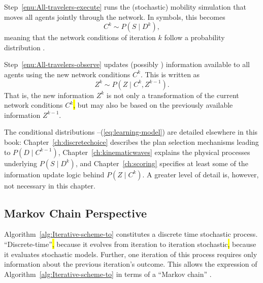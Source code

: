 
Step~\ref{enu:All-travelers-execute} runs  the (stochastic) mobility
simulation that moves all agents jointly through the network. In symbols,
this becomes
\begin{equation}
C^{k}\sim P(S\mid D^{k}),\label{eq:network-loading-model}
\end{equation}\corr{,}{}
meaning that the network conditions of iteration $k$ follow a
probability distribution .

Step~\ref{enu:All-travelers-observe} updates  (possibly
) information available to all agents
using the new network conditions $C^{k}$. This is written as
\begin{equation}
Z^{k}\sim P(Z\mid C^{k},Z^{k-1}).\label{eq:learning-model}
\end{equation}
That is, the new information $Z^{k}$ is not only a transformation
of the current network conditions $C^{k}$\hl{,} but may also be based on
the previously available information $Z^{k-1}$.

The conditional distributions --(\ref{eq:learning-model})
are detailed elsewhere in this book: Chapter~\ref{ch:discretechoice} 
describes the plan selection mechanisms leading to $P(D\mid C^{k-1})$,
Chapter~\ref{ch:kinematicwaves} explains the physical processes underlying
$P(S\mid D^{k})$, and Chapter~\ref{ch:scoring}
specifies at least some of the information update logic behind $P(Z\mid C^{k})$. 
A greater level of detail is, however, not necessary in this chapter.


\subsection{\label{sub:Markov-chain-perspective}Markov Chain Perspective}

Algorithm~\ref{alg:Iterative-scheme-to} constitutes a discrete time
stochastic process. {}``Discrete-time''\hl{,} because it evolves from
iteration to iteration\corr{:}{;} stochastic\hl{,} because it evaluates
stochastic models. Further, one iteration of this process requires only information
about the previous iteration's outcome. This allows the expression of
Algorithm~\ref{alg:Iterative-scheme-to} in terms of a {}``Markov
chain'' \citep{ross-2006}.

